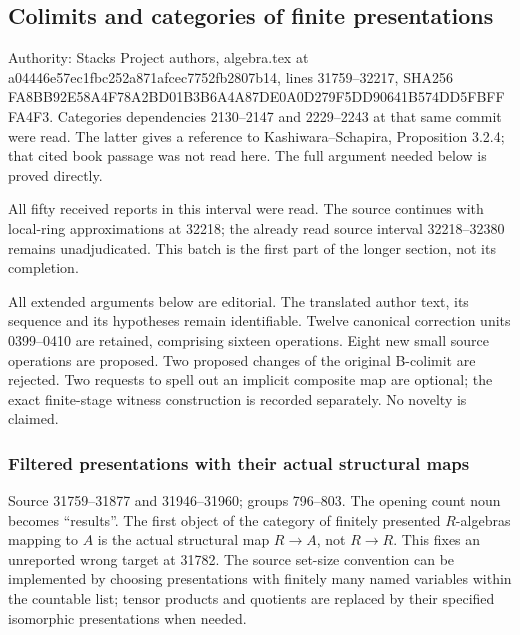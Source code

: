 \subsection{Colimits and categories of finite presentations}\label{algebra-proof-036-colimits-and-categories-of-finite-presentations}

Authority: Stacks Project authors, algebra.tex at a044\allowbreak{}46e5\allowbreak{}7ec1\allowbreak{}fbc2\allowbreak{}52a8\allowbreak{}71af\allowbreak{}cec7\allowbreak{}752f\allowbreak{}b280\allowbreak{}7b14, lines 31759--32217, SHA256 FA8B\allowbreak{}B92E\allowbreak{}58A4\allowbreak{}F78A\allowbreak{}2BD0\allowbreak{}1B3B\allowbreak{}6A4A\allowbreak{}87DE\allowbreak{}0A0D\allowbreak{}279F\allowbreak{}5DD9\allowbreak{}0641\allowbreak{}B574\allowbreak{}DD5F\allowbreak{}BFFF\allowbreak{}A4F3. Categories dependencies 2130--2147 and 2229--2243 at that same commit were read. The latter gives a reference to Kashiwara--Schapira, Proposition 3.2.4; that cited book passage was not read here. The full argument needed below is proved directly.

All fifty received reports in this interval were read. The source continues with local-ring approximations at 32218; the already read source interval 32218--32380 remains unadjudicated. This batch is the first part of the longer section, not its completion.

All extended arguments below are editorial. The translated author text, its sequence and its hypotheses remain identifiable. Twelve canonical correction units 0399--0410 are retained, comprising sixteen operations. Eight new small source operations are proposed. Two proposed changes of the original B-colimit are rejected. Two requests to spell out an implicit composite map are optional; the exact finite-stage witness construction is recorded separately. No novelty is claimed.

\subsubsection{Filtered presentations with their actual structural maps}\label{algebra-proof-036-filtered-presentations-with-their-actual-structural-maps}

Source 31759--31877 and 31946--31960; groups 796--803. The opening count noun becomes ``results''. The first object of the category of finitely presented \(R\)-algebras mapping to \(A\) is the actual structural map \(R\to A\), not \(R\to R\). This fixes an unreported wrong target at 31782. The source set-size convention can be implemented by choosing presentations with finitely many named variables within the countable list; tensor products and quotients are replaced by their specified isomorphic presentations when needed.

